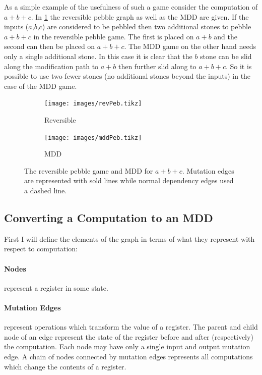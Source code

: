 As a simple example of the usefulness of such a game consider the computation
of $a+b+c$. In \cref{fig:mddExample} the reversible pebble graph as well as the
MDD are given. If the inputs ($a$,$b$,$c$) are considered to be pebbled then
two additional stones to pebble $a+b+c$ in the reversible pebble game. The
first is placed on $a+b$ and the second can then be placed on $a+b+c$. The MDD
game on the other hand needs only a single additional stone. In this case it is
clear that the $b$ stone can be slid along the modification path to $a+b$ then
further slid along to $a+b+c$. So it is possible to use two fewer stones (no
additional stones beyond the inputs) in the case of the MDD game.

\begin{figure}
  \centering
  \begin{subfigure}{0.3\textwidth}
    \texttt{[image: images/revPeb.tikz]}
    \caption{Reversible}
  \end{subfigure}
  \qquad\qquad
  \begin{subfigure}{0.3\textwidth}
    \texttt{[image: images/mddPeb.tikz]}
    \caption{MDD}
  \end{subfigure}
  \label{fig:mddExample}
  \caption{The reversible pebble game and MDD for $a+b+c$. Mutation edges are
  represented with sold lines while normal dependency edges used a dashed line.}
\end{figure}


\subsection{Converting a Computation to an MDD}

First I will define the elements of the graph in terms of what they represent
with respect to computation:

\paragraph{Nodes} represent a register in some state.

\paragraph{Mutation Edges} represent operations which transform the value
of a register. The parent and child node of an edge represent the state of the
register before and after (respectively) the computation. Each node may have
only a single input and output mutation edge. A chain of nodes connected by
mutation edges represents all computations which change the contents of a
register.

